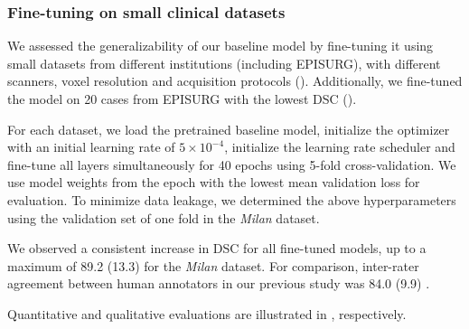 \subsubsection{Fine-tuning on small clinical datasets}

We assessed the generalizability of our baseline model by fine-tuning it using small datasets from different institutions (including EPISURG), with different scanners, voxel resolution and acquisition protocols ().
Additionally, we fine-tuned the model on 20 cases from EPISURG with the lowest \ac{DSC} ().

For each dataset, we load the pretrained baseline model, initialize the optimizer with an initial learning rate of $5 \times 10^{-4}$, initialize the learning rate scheduler and fine-tune all layers simultaneously for 40 epochs using 5-fold cross-validation.
We use model weights from the epoch with the lowest mean validation loss for evaluation.
To minimize data leakage, we determined the above hyperparameters using the validation set of one fold in the \textit{Milan} dataset.

We observed a consistent increase in \ac{DSC} for all fine-tuned models, up to a maximum of 89.2 (13.3) for the \textit{Milan} dataset.
For comparison, inter-rater agreement between human annotators in our previous study was 84.0 (9.9) \cite{perez-garcia_simulation_2020}.

Quantitative and qualitative evaluations are illustrated in , respectively.

